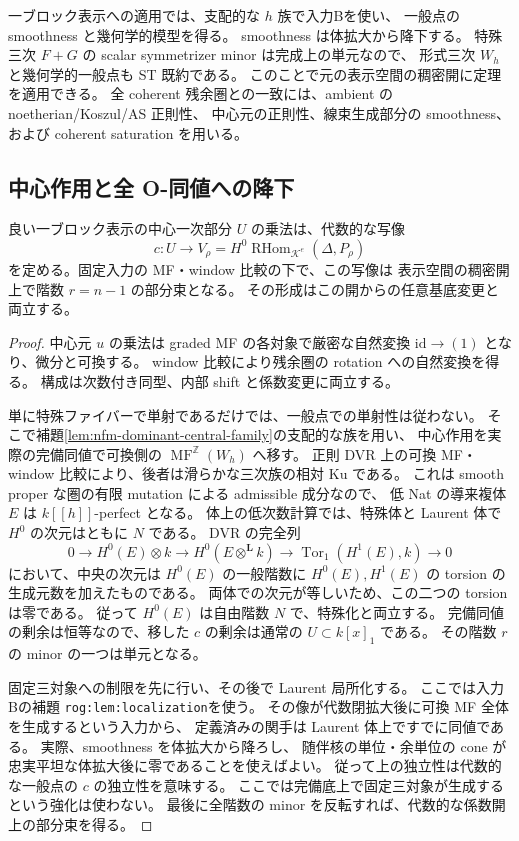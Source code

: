 一ブロック表示への適用では、支配的な $h$ 族で入力Bを使い、
一般点の smoothness と幾何学的模型を得る。
smoothness は体拡大から降下する。
特殊三次 $F+G$ の scalar symmetrizer minor は完成上の単元なので、
形式三次 $W_h$ と幾何学的一般点も ST 既約である。
このことで元の表示空間の稠密開に定理を適用できる。
全 coherent 残余圏との一致には、ambient の noetherian/Koszul/AS 正則性、
中心元の正則性、線束生成部分の smoothness、および coherent saturation を用いる。


\subsection{中心作用と全 O-同値への降下}

\begin{lemma}[中心一次作用の一般点での単射性]
\label{lem:nfm-residual-central-injection}
良い一ブロック表示の中心一次部分 $U$ の乗法は、代数的な写像
\[
 c:U\longrightarrow V_\rho
   =H^0\operatorname{RHom}_{\mathcal K^e}(\Delta,P_\rho)
\]
を定める。固定入力の MF・window 比較の下で、この写像は
表示空間の稠密開上で階数 $r=n-1$ の部分束となる。
その形成はこの開からの任意基底変更と両立する。
\end{lemma}

\begin{proof}
中心元 $u$ の乗法は graded MF の各対象で厳密な自然変換
$\mathrm{id}\to(1)$ となり、微分と可換する。
window 比較により残余圏の rotation への自然変換を得る。
構成は次数付き同型、内部 shift と係数変更に両立する。

単に特殊ファイバーで単射であるだけでは、一般点での単射性は従わない。
そこで補題\ref{lem:nfm-dominant-central-family}の支配的な族を用い、
中心作用を実際の完備同値で可換側の $\operatorname{MF}^{\mathbb Z}(W_h)$ へ移す。
正則 DVR 上の可換 MF・window 比較により、後者は滑らかな三次族の相対 Ku である。
これは smooth proper な圏の有限 mutation による admissible 成分なので、
低 Nat の導来複体 $E$ は $k[[h]]$-perfect となる。
体上の低次数計算では、特殊体と Laurent 体で $H^0$ の次元はともに $N$ である。
DVR の完全列
\[
 0\longrightarrow H^0(E)\otimes k
 \longrightarrow H^0(E\otimes^{\mathbf L}k)
 \longrightarrow\operatorname{Tor}_1(H^1(E),k)
 \longrightarrow0
\]
において、中央の次元は $H^0(E)$ の一般階数に
$H^0(E),H^1(E)$ の torsion の生成元数を加えたものである。
両体での次元が等しいため、この二つの torsion は零である。
従って $H^0(E)$ は自由階数 $N$ で、特殊化と両立する。
完備同値の剰余は恒等なので、移した $c$ の剰余は通常の $U\subset k[x]_1$ である。
その階数 $r$ の minor の一つは単元となる。

固定三対象への制限を先に行い、その後で Laurent 局所化する。
ここでは入力Bの補題 \texttt{rog:lem:localization}を使う。
その像が代数閉拡大後に可換 MF 全体を生成するという入力から、
定義済みの関手は Laurent 体上ですでに同値である。
実際、smoothness を体拡大から降ろし、
随伴核の単位・余単位の cone が忠実平坦な体拡大後に零であることを使えばよい。
従って上の独立性は代数的な一般点の $c$ の独立性を意味する。
ここでは完備底上で固定三対象が生成するという強化は使わない。
最後に全階数の minor を反転すれば、代数的な係数開上の部分束を得る。
\end{proof}

